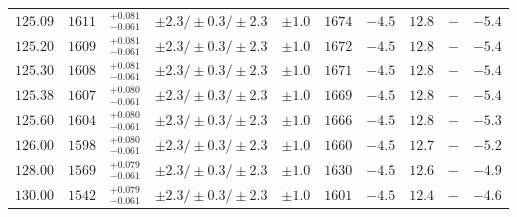\begin{table}[ht!]
\begin{center}
\begin{small}
\begin{tabular}{cccccccc|cc}
$125.09$ & $1611$ & $^{+0.081}_{-0.061}$ & $\pm 2.3/\pm 0.3/\pm 2.3$ & $\pm 1.0$ & $1674$ & $-4.5$ & $12.8$ & $-$ & $-5.4$ \\
$125.20$ & $1609$ & $^{+0.081}_{-0.061}$ & $\pm 2.3/\pm 0.3/\pm 2.3$ & $\pm 1.0$ & $1672$ & $-4.5$ & $12.8$ & $-$ & $-5.4$ \\
$125.30$ & $1608$ & $^{+0.081}_{-0.061}$ & $\pm 2.3/\pm 0.3/\pm 2.3$ & $\pm 1.0$ & $1671$ & $-4.5$ & $12.8$ & $-$ & $-5.4$ \\
$125.38$ & $1607$ & $^{+0.080}_{-0.061}$ & $\pm 2.3/\pm 0.3/\pm 2.3$ & $\pm 1.0$ & $1669$ & $-4.5$ & $12.8$ & $-$ & $-5.4$ \\
$125.60$ & $1604$ & $^{+0.080}_{-0.061}$ & $\pm 2.3/\pm 0.3/\pm 2.3$ & $\pm 1.0$ & $1666$ & $-4.5$ & $12.8$ & $-$ & $-5.3$ \\
$126.00$ & $1598$ & $^{+0.080}_{-0.061}$ & $\pm 2.3/\pm 0.3/\pm 2.3$ & $\pm 1.0$ & $1660$ & $-4.5$ & $12.7$ & $-$ & $-5.2$ \\
$128.00$ & $1569$ & $^{+0.079}_{-0.061}$ & $\pm 2.3/\pm 0.3/\pm 2.3$ & $\pm 1.0$ & $1630$ & $-4.5$ & $12.6$ & $-$ & $-4.9$ \\
$130.00$ & $1542$ & $^{+0.079}_{-0.061}$ & $\pm 2.3/\pm 0.3/\pm 2.3$ & $\pm 1.0$ & $1601$ & $-4.5$ & $12.4$ & $-$ & $-4.6$ \\
\bottomrule
\end{tabular}%
\end{small}%
\end{center}%
\end{table}

